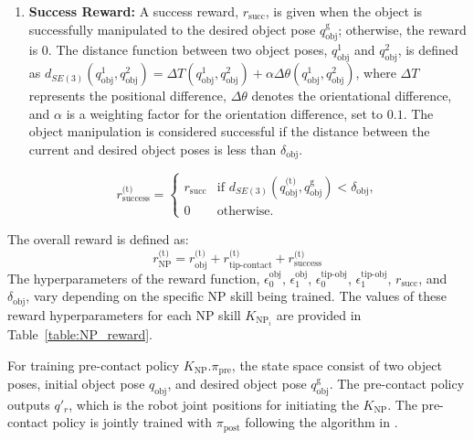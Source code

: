 \begin{itemize}
\begin{enumerate}
    \item \textbf{Success Reward:} A success reward, \( r_{\text{succ}} \), is given when the object is successfully manipulated to the desired object pose \( q^\text{g}_\text{obj} \); otherwise, the reward is 0. The distance function between two object poses, \( q^1_\text{obj} \) and \( q^2_\text{obj} \), is defined as \( d_{SE(3)}(q^1_\text{obj}, q^2_\text{obj}) = \Delta T(q^1_\text{obj}, q^2_\text{obj}) + \alpha \Delta\theta(q^1_\text{obj}, q^2_\text{obj}) \), where \( \Delta T \) represents the positional difference, \( \Delta\theta \) denotes the orientational difference, and \( \alpha \) is a weighting factor for the orientation difference, set to \( 0.1 \). The object manipulation is considered successful if the distance between the current and desired object poses is less than \( \delta_\text{obj} \).

    \[
    r^\text{(t)}_{\text{success}} =
    \begin{cases} 
    r_{\text{succ}} & \text{if } d_{SE(3)}(q^\text{(t)}_{\text{obj}}, q^\text{g}_{\text{obj}}) < \delta_\text{obj}, \\
    0 & \text{otherwise}.
    \end{cases}
    \]

    \end{enumerate}

    The overall reward is defined as:
    \[
    r^\text{(t)}_{\text{NP}} = r^\text{(t)}_{\text{obj}} + r^\text{(t)}_{\text{tip-contact}} + r^\text{(t)}_{\text{success}}
    \]
    The hyperparameters of the reward function, $\epsilon_0^{\text{obj}}$, $\epsilon_1^{\text{obj}}$, $\epsilon_0^{\text{tip-obj}}$, $\epsilon_1^{\text{tip-obj}}$, $r_{\text{succ}}$, and $\delta_\text{obj}$, vary depending on the specific NP skill being trained. The values of these reward hyperparameters for each NP skill \( K_{\text{NP}_i} \) are provided in Table~\ref{table:NP_reward}.

\end{itemize}


For training pre-contact policy $K_\text{NP}.\pi_\text{pre}$, the state space consist of two object poses, initial object pose $q_\text{obj}$, and desired object pose $ q^\text{g}_\text{obj}$. The pre-contact policy outputs $q'_r$, which is the robot joint positions for initiating the $K_\text{NP}$. The pre-contact policy is jointly trained with $\pi_\text{post}$ following the algorithm in \citet{kim2023pre}.

